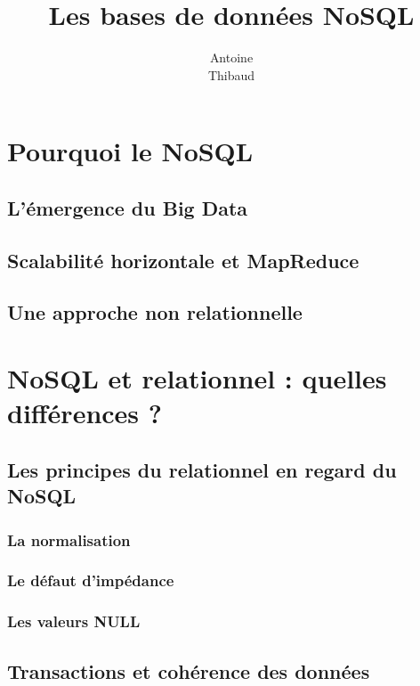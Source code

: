 \documentclass[12pt,titlepage,a4paper]{report}
\title{Les bases de données NoSQL}
\author{Antoine \bsc{Augusti}\\ Thibaud \bsc{Dauce}}
\begin{document}
	\dominitoc
	\tableofcontents

	\chapter{Pourquoi le NoSQL}
	\minitoc

		\section{L'émergence du Big Data}
			

		\section{Scalabilité horizontale et MapReduce}
			

		\section{Une approche non relationnelle}
			

	\chapter{NoSQL et relationnel : quelles différences ?}
	\minitoc

		\section{Les principes du relationnel en regard du NoSQL}
			\subsection{La normalisation}
			\subsection{Le défaut d'impédance}
			\subsection{Les valeurs NULL}

		\section{Transactions et cohérence des données}
\end{document}
